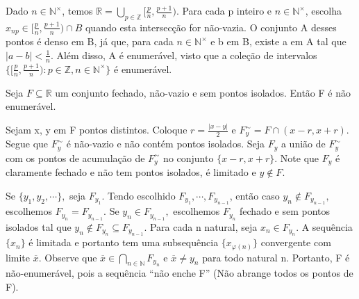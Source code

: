 \documentclass[Analysis/analysis_notes.tex]{subfiles}
\begin{document}
\begin{proof*}
	Dado $n\in \mathbb{N}^{\times}$, temos $\mathbb{R} = \displaystyle\bigcup_{p\in \mathbb{Z}}^{}{\biggl[\frac{p}{n}, \frac{p+1}{n}\biggr)}$. Para
	cada p inteiro e $n\in \mathbb{N}^{\times}$, escolha $x_{np}\in\biggl[\frac{p}{n}, \frac{p+1}{n}\biggr)\cap{B}$ quando esta intersec\c c\~ao
	for n\~ao-vazia. O conjunto A desses pontos \'e denso em B, j\'a que, para cada $n\in \mathbb{N}^{\times}$ e b em B, existe a em A
	tal que $|a-b|<\frac{1}{n}$. Al\'em disso, A \'e enumer\'avel, visto que a cole\c c\~ao de intervalos $\biggl\{\biggl[\frac{p}{n}, \frac{p+1}{n}\biggr): p\in \mathbb{Z}, n\in \mathbb{N}^{\times}\biggr\}$
	\'e enumer\'avel.\qedsymbol
\end{proof*}
\begin{theorem*}
	Seja $F\subseteq{\mathbb{R}}$ um conjunto fechado, n\~ao-vazio e sem pontos isolados. Ent\~ao F \'e n\~ao enumer\'avel.
\end{theorem*}
\begin{proof*}
	Sejam x, y em F pontos distintos. Coloque $r = \frac{|x-y|}{2}$ e $F_{y}^{\sim} = F\cap{(x-r, x+r)}.$ Segue que $F_{y}^{\sim}$
	\'e n\~ao-vazio e n\~ao cont\'em pontos isolados. Seja $F_{y}$ a uni\~ao de $F_{y}^{\sim}$ com os pontos de acumula\c c\~ao de
	$F_{y}^{\sim}$ no conjunto $\{x-r,x+r\}.$ Note que $F_{y}$ \'e claramente fechado e n\~ao tem pontos isolados, \'e limitado e
	$y\not\in F.$

	Se $\{y_{1},y_{2},\cdots\},$ seja $F_{y_{1}}.$ Tendo escolhido $F_{y_{1}},\cdots, F_{y_{n-1}}$, ent\~ao caso $y_{n}\not\in F_{y_{n-1}},$
	escolhemos $F_{y_{n}}=F_{y_{n-1}}.$ Se $y_{n}\in F_{y_{n-1}},$ escolhemos $F_{y_{n}}$ fechado e sem pontos isolados tal que
	$y_{n}\not\in F_{y_{n}}\subseteq{F_{y_{n-1}}}.$ Para cada n natural, seja $x_{n}\in F_{y_{n}}.$ A sequ\^encia $\{x_{n}\}$ \'e limitada
	e portanto tem uma subsequ\^encia $\{x_{\varphi(n)}\}$ convergente com limite $\overline{x}$. Observe que $\overline{x}\in \bigcap_{n\in \mathbb{N}}^{}{F_{y_{n}}}$
	e $\overline{x}\neq y_{n}$ para todo natural n. Portanto, F \'e n\~ao-enumer\'avel, pois a sequ\^encia ``n\~ao enche F'' (N\~ao abrange
	todos os pontos de F). \qedsymbol
\end{proof*}
\end{document}
